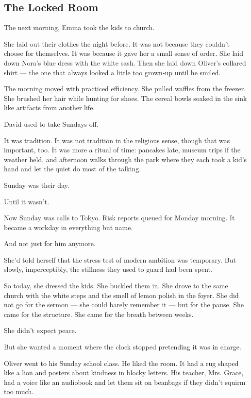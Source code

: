 
\subsection{The Locked Room}

The next morning, Emma took the kids to church.

She laid out their clothes the night before. 
It was not because they couldn’t choose for themselves.
It was because it gave her a small sense of order. 
She laid down Nora’s blue dress with the white sash. 
Then she laid down Oliver’s collared shirt --- 
the one that always looked a little too grown-up until he smiled.

The morning moved with practiced efficiency. 
She pulled waffles from the freezer. 
She brushed her hair while hunting for shoes.
The cereal bowls soaked in the sink like artifacts from another life. 

David used to take Sundays off.

It was tradition. 
It was not tradition in the religious sense, though that was important, too. 
It was more a ritual of time: pancakes late, museum trips if the weather held, 
and afternoon walks through the park where they each took a kid’s hand and let 
the quiet do most of the talking.

Sunday was their day.

Until it wasn’t.

Now Sunday was calls to Tokyo. 
Risk reports queued for Monday morning. 
It became a workday in everything but name.

And not just for him anymore.

She’d told herself that the stress test of modern ambition was temporary. 
But slowly, imperceptibly, the stillness they used to guard had been spent.

So today, she dressed the kids. 
She buckled them in. 
She drove to the same church with the white steps and the smell of lemon polish in the foyer. 
She did not go for the sermon --- she could barely remember it --- but for the pause. 
She came for the structure. 
She came for the breath between weeks.

She didn’t expect peace.

But she wanted a moment where the clock stopped pretending it was in charge.

Oliver went to his Sunday school class. 
He liked the room. 
It had a rug shaped like a lion and posters about kindness in blocky letters. 
His teacher, Mrs. Grace, had a voice like an audiobook and let them 
sit on beanbags if they didn’t squirm too much.

